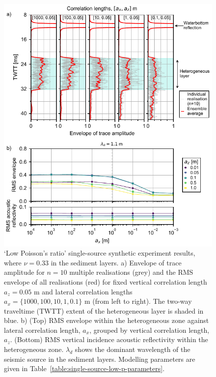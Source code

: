 \documentclass[se,manuscript]{copernicus}
\begin{document}
\begin{figure}
    \includegraphics{figures/si_fig14.pdf}
    \caption{`Low Poisson's ratio' single-source synthetic experiment results, where $\nu=0.33$ in the sediment layers.
        a) Envelope of trace amplitude for $n=10$ multiple realisations (grey) and the RMS envelope of all realisations (red) for fixed vertical correlation length $a_z=0.05$ m and lateral correlation lengths $a_x=\{1000, 100, 10, 1, 0.1\}$ \unit{m} (from left to right).
        The two-way traveltime (TWTT) extent of the heterogeneous layer is shaded in blue.
        b) (Top) RMS envelope within the heterogeneous zone against lateral correlation length, $a_x$, grouped by vertical correlation length, $a_z$.
        (Bottom) RMS vertical incidence acoustic reflectivity within the heterogeneous zone.
        $\lambda_d$ shows the dominant wavelength of the seismic source in the sediment layers.
        Modelling parameters are given in Table~\ref{table:single-source-low-p-parameters}.}
    \label{fig:single-source-low-poisson} 
\end{figure}
\end{document}
